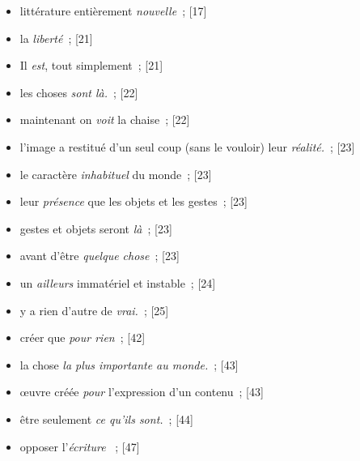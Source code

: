 \documentclass[12pt, a4paper]{article}
\begin{document}
    
\begin{itemize}

    \item littérature entièrement \textit{nouvelle}{\color{gray}~; [17]}

    \item la \textit{liberté}{\color{gray}~; [21]}

    \item Il \textit{est}, tout simplement{\color{gray}~; [21]}

    \item les choses \textit{sont là.}{\color{gray}~; [22]}

    \item maintenant on \textit{voit} la chaise{\color{gray}~; [22]}

    \item l’image a restitué d’un seul coup (sans le vouloir) leur \textit{réalité.}{\color{gray}~; [23]}

    \item le caractère \textit{inhabituel} du monde{\color{gray}~; [23]}

    \item leur \textit{présence} que les objets et les gestes{\color{gray}~; [23]}

    \item gestes et objets seront \textit{là}{\color{gray}~; [23]}

    \item avant d’être \textit{quelque chose}{\color{gray}~; [23]}

    \item un \textit{ailleurs} immatériel et instable{\color{gray}~; [24]}

    \item y a rien d’autre de \textit{vrai.}{\color{gray}~; [25]}

    \item créer que \textit{pour rien}{\color{gray}~; [42]}

    \item la chose \textit{la plus importante au monde.}{\color{gray}~; [43]}

    \item œuvre créée \textit{pour } l’expression d’un contenu{\color{gray}~; [43]}

    \item être seulement \textit{ce qu’ils sont.}{\color{gray}~; [44]}

    \item opposer l’\textit{écriture }{\color{gray}~; [47]}


\end{itemize}
\end{document}
